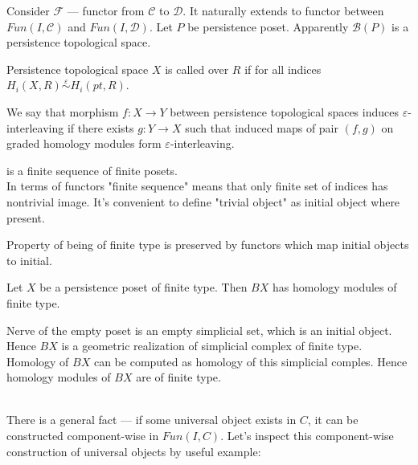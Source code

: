 Consider $\mathcal{F}$ --- functor from $\mathcal{C}$ to $\mathcal{D}$. It naturally extends to functor between $Fun(I,\mathcal{C})$ and $Fun(I,\mathcal{D})$. Let $P$ be persistence poset. Apparently $\mathcal{B}(P)$ is a persistence topological space.\\

\begin{definition}
  Persistence topological space $X$ is called  over $R$ if for all indices\\ $H_i(X,R) \stackrel{\varepsilon}{\sim} H_i(pt,R)$.
\end{definition}

\begin{definition}
  We say that morphism $f : X \to Y$ between persistence topological spaces induces $\varepsilon$-interleaving if there exists $g : Y \to X$ such that induced maps of pair $(f,g)$ on graded homology modules form $\varepsilon$-interleaving.
\end{definition}

\begin{definition}
   is a finite sequence of finite posets.\\

  In terms of functors "finite sequence" means that only finite set of indices has nontrivial image. It's convenient to define "trivial object" as initial object where present.
\end{definition}

Property of being of finite type is preserved by functors which map initial objects to initial.\\

\begin{proposition}
  Let $X$ be a persistence poset of finite type. Then $BX$ has homology modules of finite type.
\end{proposition}

\begin{pf}
  Nerve of the empty poset is an empty simplicial set, which is an initial object. Hence $BX$ is a geometric realization of simplicial complex of finite type. Homology of $BX$ can be computed as homology of this simplicial comples. Hence homology modules of $BX$ are of finite type.
\end{pf}\\

There is a general fact --- if some universal object exists in $C$, it can be constructed component-wise in $Fun(I,C)$. Let's inspect this component-wise construction of universal objects by useful example:\\

